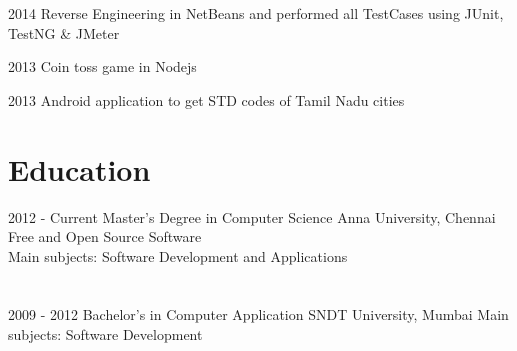 \documentclass[]{friggeri-cv}
\begin{document}
\begin{entrylist}
  \entry
    {2014}
    {Reverse Engineering in NetBeans and performed all TestCases using JUnit, TestNG \& JMeter}
    {}
    {\emph{}}  
    
\end{entrylist}
\begin{entrylist}
  \entry
    {2013}
    {Coin toss game in Nodejs}
    {}
    {\emph{}}
  
    
\end{entrylist}



\begin{entrylist}
  \entry
    {2013}
    {Android application to get STD codes of Tamil Nadu cities}
    {}
    {\emph{}}
  
    
\end{entrylist}
\newpage
\section{Education}
\begin{entrylist}
  \entry
    {2012 - Current}
    {Master's Degree in Computer Science}
    {Anna University, Chennai}
    {Free and Open Source Software\\
    Main subjects: Software Development and Applications\\
    \emph{}\\
    \emph{}\\}
  \entry
    {2009 - 2012}
    {Bachelor's in Computer Application}
    {SNDT University, Mumbai}
    {Main subjects: Software Development\\
    \emph{}\\
    \emph{}\\}
 
\end{entrylist}
\end{document}

